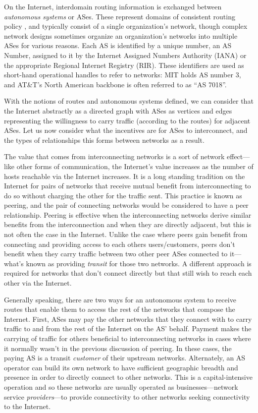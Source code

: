 On the Internet, interdomain routing information is exchanged between \emph{autonomous systems} or ASes. These represent domains of consistent routing policy \cite{rfc1930}, and typically consist of a single organization's network, though complex network designs sometimes organize an organization's networks into multiple ASes for various reasons. Each AS is identified by a unique number, an AS Number, assigned to it by the Internet Assigned Numbers Authority (IANA) or the appropriate Regional Internet Registry (RIR). These identifiers are used as short-hand operational handles to refer to networks: MIT holds AS number 3, and AT\&T's North American backbone is often referred to as ``AS 7018''.

With the notions of routes and autonomous systems defined, we can consider that the Internet abstractly as a directed graph with ASes as vertices and edges representing the willingness to carry traffic (according to the routes) for adjacent ASes. Let us now consider what the incentives are for ASes to interconnect, and the types of relationships this forms between networks as a result.

The value that comes from interconnecting networks is a sort of network effect---like other forms of communication, the Internet's value increases as the number of hosts reachable via the Internet increases. It is a long standing tradition on the Internet for pairs of networks that receive mutual benefit from interconnecting to do so without charging the other for the traffic sent. This practice is known as peering, and the pair of connecting networks would be considered to have a peer relationship. Peering is effective when the interconnecting networks derive similar benefits from the interconnection and when they are directly adjacent, but this is not often the case in the Internet. Unlike the case where peers gain benefit from connecting and providing access to each others users/customers, peers don't benefit when they carry traffic between two other peer ASes connected to it---what's known as providing \emph{transit} for those two networks. A different approach is required for networks that don't connect directly but that still wish to reach each other via the Internet.

Generally speaking, there are two ways for an autonomous system to receive routes that enable them to access the rest of the networks that compose the Internet. First, ASes may pay the other networks that they connect with to carry traffic to and from the rest of the Internet on the AS' behalf. Payment makes the carrying of traffic for others beneficial to interconnecting networks in cases where it normally wasn't in the previous discussion of peering. In these cases, the paying AS is a transit \emph{customer} of their upstream networks. Alternately, an AS operator can build its own network to have sufficient geographic breadth and presence in order to directly connect to other networks. This is a capital-intensive operation and so these networks are usually operated as businesses---network service \emph{providers}---to provide connectivity to other networks seeking connectivity to the Internet.

